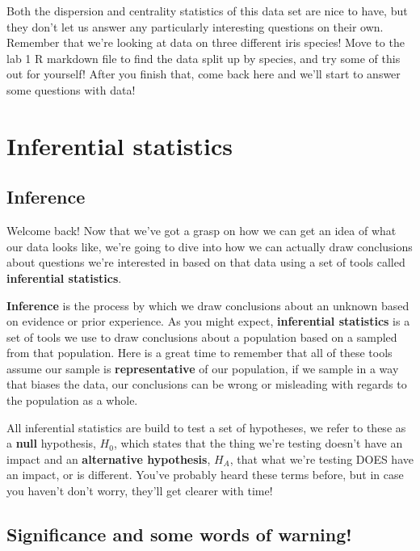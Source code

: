 \documentclass[
]{article}
\begin{document}
Both the dispersion and centrality statistics of this data set are nice
to have, but they don't let us answer any particularly interesting
questions on their own. Remember that we're looking at data on three
different iris species! Move to the lab 1 R markdown file to find the
data split up by species, and try some of this out for yourself! After
you finish that, come back here and we'll start to answer some questions
with data!

\hypertarget{inferential-statistics}{%
\section{Inferential statistics}\label{inferential-statistics}}

\hypertarget{inference}{%
\subsection{Inference}\label{inference}}

Welcome back! Now that we've got a grasp on how we can get an idea of
what our data looks like, we're going to dive into how we can actually
draw conclusions about questions we're interested in based on that data
using a set of tools called \textbf{inferential statistics}.

\textbf{Inference} is the process by which we draw conclusions about an
unknown based on evidence or prior experience. As you might expect,
\textbf{inferential statistics} is a set of tools we use to draw
conclusions about a population based on a sampled from that population.
Here is a great time to remember that all of these tools assume our
sample is \textbf{representative} of our population, if we sample in a
way that biases the data, our conclusions can be wrong or misleading
with regards to the population as a whole.

All inferential statistics are build to test a set of hypotheses, we
refer to these as a \textbf{null} hypothesis, \(H_0\), which states that
the thing we're testing doesn't have an impact and an
\textbf{alternative hypothesis}, \(H_A\), that what we're testing DOES
have an impact, or is different. You've probably heard these terms
before, but in case you haven't don't worry, they'll get clearer with
time!

\hypertarget{significance-and-some-words-of-warning}{%
\subsection{Significance and some words of
warning!}\label{significance-and-some-words-of-warning}}
\end{document}

